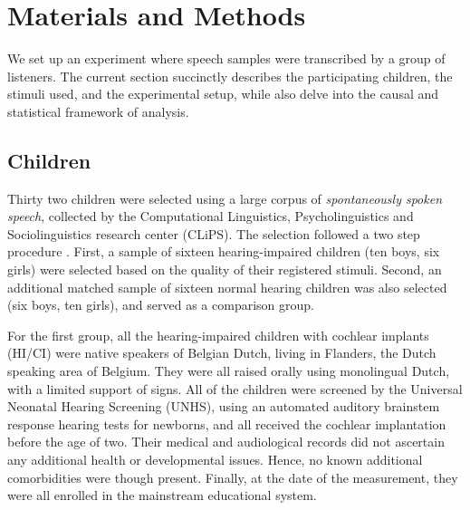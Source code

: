 \section{Materials and Methods} \label{S:materials_methods}
%
We set up an experiment where speech samples were transcribed by a group of listeners. The current section succinctly describes the participating children, the stimuli used, and the experimental setup, while also delve into the causal and statistical framework of analysis.
%
%
\subsection{Children} \label{sS:children}
%
Thirty two children were selected using a large corpus of \textit{spontaneously spoken speech}, collected by the Computational Linguistics, Psycholinguistics and Sociolinguistics research center (CLiPS). The selection followed a two step procedure \cite{Faes_et_al_2021}. First, a sample of sixteen hearing-impaired children (ten boys, six girls) were selected based on the quality of their registered stimuli. Second, an additional matched sample of sixteen normal hearing children was also selected (six boys, ten girls), and served as a comparison group.
%
\begin{comment}
	Similar designs were used by \citet{Boonen_et_al_2020} and \citet{Faes_et_al_2021}. However, in the former case the number of samples were low, while in the latter, the design was unbalanced and not conducive to appropriate inferences from the pairwise comparisons.
\end{comment}

For the first group, all the hearing-impaired children with cochlear implants (HI/CI) were native speakers of Belgian Dutch, living in Flanders, the Dutch speaking area of Belgium. They were all raised orally using monolingual Dutch, with a limited support of signs. All of the children were screened by the Universal Neonatal Hearing Screening (UNHS), using an automated auditory brainstem response hearing tests for newborns, and all received the cochlear implantation before the age of two. Their medical and audiological records did not ascertain any additional health or developmental issues. Hence, no known additional comorbidities were though present. Finally, at the date of the measurement, they were all enrolled in the mainstream educational system.

